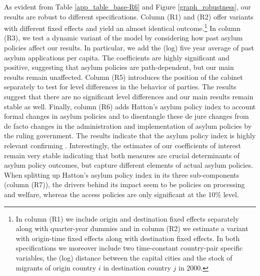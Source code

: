 \documentclass[a4paper,12pt]{article}
\begin{document}

As evident from Table \ref{app_table_base-R6} and Figure \ref{graph_robustness}, our results are robust to different specifications.
 Column (R1) and (R2)  offer variants with different fixed effects and yield an almost identical outcome.\footnote{In column (R1) we include origin and destination fixed effects separately along with quarter-year dummies and in column (R2) we estimate a variant with origin-time fixed effects along with destination fixed effects. In both specifications we moreover include two time-constant country-pair specific variables, the (log) distance between the capital cities and the stock of migrants of origin country $i$ in destination country $j$ in 2000.} In column (R3), we test a dynamic variant of the model by considering how past asylum policies affect our results. In particular, we add the (log) five year average of past asylum applications per capita. The coefficients are highly significant and positive, suggesting that asylum policies are path-dependent, but our main results remain unaffected. Column (R5) introduces the position of the cabinet separately to test for level differences in the behavior of parties. The results suggest that there are no significant level differences and our main results remain stable as well. Finally, column (R6) adds Hatton's asylum policy index to account formal changes in asylum policies and to disentangle these de jure changes from de facto changes in the administration and implementation of asylum policies by the ruling government. The results indicate that the asylum policy index is highly relevant confirming \citet{hatton2016}. Interestingly, the estimates of our coefficients of interest remain very stable indicating that both measures are crucial determinants of asylum policy outcomes, but capture different elements of actual asylum policies. When splitting up Hatton's asylum policy index in its three sub-components (column (R7)), the drivers behind its impact seem to be policies on processing and welfare, whereas the access policies are only significant at the 10\% level.
\end{document}
